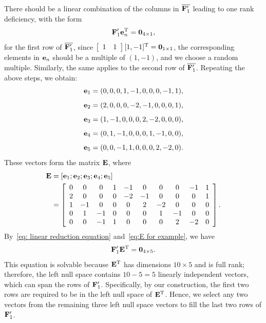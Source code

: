 \documentclass[conference,letterpaper]{IEEEtran}
\begin{document}
\begin{example}
There should be a linear combination of the columns in $\overline{{\bf F}^{\prime}_1}$ leading to one rank deficiency, with the form
\begin{align}
 {\bf F}'_1 {\bf e}_n^{\text{\rm T}} = {\bf 0}_{4 \times 1},
 \label{eq: linear reduction equation}
\end{align}
for the first row of $\overline{{\bf F}^{\prime}_1}$, since $\left[ {\begin{array}{cc} 1 & 1 \\ \end{array}} \right] [1, -1]^{\text{\rm T}} = {\bf 0}_{1 \times 1}$, the corresponding elements in ${\bf e}_n$ should be a multiple of $(1, -1)$, and we choose a random multiple. Similarly, the same applies to the second row of $\overline{{\bf F}^{\prime}_1}$. Repeating the above steps, we obtain:
\[
{\bf e}_1 = (0, 0, 0, 1, -1, 0, 0, 0, -1, 1),
\]
\[
{\bf e}_2 = (2, 0, 0, 0, -2, -1, 0, 0, 0, 1),
\]
\[
{\bf e}_3 = (1, -1, 0, 0, 0, 2, -2, 0, 0, 0),
\]
\[
{\bf e}_4 = (0, 1, -1, 0, 0, 0, 1, -1, 0, 0),
\]
\[
{\bf e}_5 = (0, 0, -1, 1, 0, 0, 0, 2, -2, 0).
\]
These vectors form the matrix ${\bf E}$, where
\begin{align}
{\bf E} &= 
\left[ {\bf e}_1 ;  {\bf e}_2 ;  {\bf e}_3 ;  {\bf e}_4 ; {\bf e}_5  \right] 
\nonumber \\
&=  
\left[
\begin{array}{cccccccccc}
 0 & 0 & 0 & 1 & -1 & 0 & 0 & 0 & -1 & 1 \\
 2 & 0 & 0 & 0 & -2 & -1 & 0 & 0 & 0 & 1 \\
 1 & -1 & 0 & 0 & 0 & 2 & -2 & 0 & 0 & 0 \\
 0 & 1 & -1 & 0 & 0 & 0 & 1 & -1 & 0 & 0 \\
 0 & 0 & -1 & 1 & 0 & 0 & 0 & 2 & -2 & 0 \\
\end{array}
\right].
\label{eq:E for example}
\end{align}
By~\eqref{eq: linear reduction equation}  and~\eqref{eq:E for example}, we have 
\begin{align}
 {\bf F}'_1 {\bf E}^{\text{\rm T}} =  {\bf 0}_{4\times 5}.  \label{eq:equations for example}
 \end{align}
This equation is solvable because ${\bf E}^{\text{\rm T}}$ has dimensions $10 \times 5$ and is full rank; therefore, the left null space contains $10 - 5 = 5$ linearly independent vectors, which can span the rows of ${\bf F}'_1$. Specifically, by our construction, the first two rows are required to be in the left null space of ${\bf E}^{\text{\rm T}}$. Hence, we select any two vectors from the remaining three left null space vectors to fill the last two rows of ${\bf F}^{\prime}_1$.

\end{example}
\end{document}
